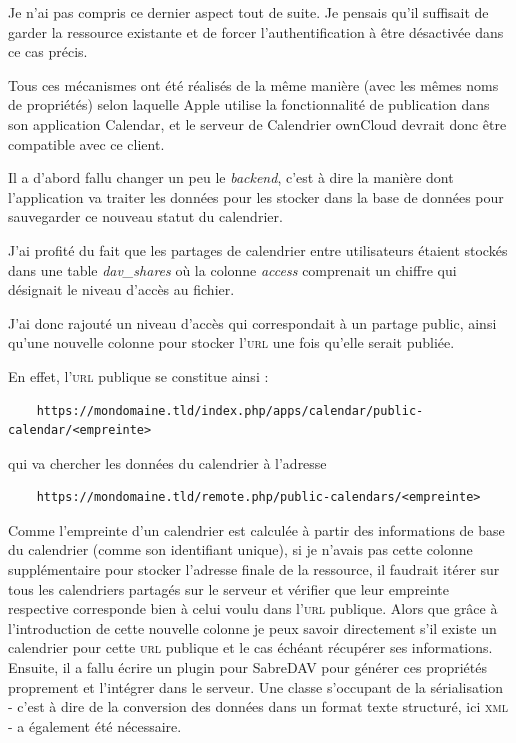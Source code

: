 \documentclass[10pt,a4paper, twoside]{report}
\begin{document}
	Je n'ai pas compris ce dernier aspect tout de suite. Je pensais qu'il suffisait de garder la ressource existante et de forcer l'authentification à être désactivée dans ce cas précis.
	
	Tous ces mécanismes ont été réalisés de la même manière (avec les mêmes noms de propriétés) selon laquelle Apple utilise la fonctionnalité de publication dans son application Calendar, et le serveur de Calendrier ownCloud devrait donc être compatible avec ce client.
	
	Il a d'abord fallu changer un peu le \textit{backend}, c'est à dire la manière dont l'application va traiter les données pour les stocker dans la base de données pour sauvegarder ce nouveau statut du calendrier.
	
	J'ai profité du fait que les partages de calendrier entre utilisateurs étaient stockés dans une table \textit{dav\_shares} où la colonne \textit{access} comprenait un chiffre qui désignait le niveau d'accès au fichier.
	
	J'ai donc rajouté un niveau d'accès qui correspondait à un partage public, ainsi qu'une nouvelle colonne pour stocker l'\textsc{url} une fois qu'elle serait publiée. 
	
	En effet, l'\textsc{url} publique se constitue ainsi : 
	\begin{verbatim}
	https://mondomaine.tld/index.php/apps/calendar/public-calendar/<empreinte>
	\end{verbatim}
	qui va chercher les données du calendrier à l'adresse
	\begin{verbatim}
	https://mondomaine.tld/remote.php/public-calendars/<empreinte>
	\end{verbatim}
	
	Comme l'empreinte d'un calendrier est calculée à partir des informations de base du calendrier (comme son identifiant unique), si je n'avais pas cette colonne supplémentaire pour stocker l'adresse finale de la ressource, il faudrait itérer sur tous les calendriers partagés sur le serveur et vérifier que leur empreinte respective corresponde bien à celui voulu dans l'\textsc{url} publique. Alors que grâce à l'introduction de cette nouvelle colonne je peux savoir directement s'il existe un calendrier pour cette \textsc{url} publique et le cas échéant récupérer ses informations.
	\\
	
	Ensuite, il a fallu écrire un plugin pour SabreDAV pour générer ces propriétés proprement et l'intégrer dans le serveur. Une classe s'occupant de la sérialisation - c'est à dire de la conversion des données dans un format texte structuré, ici \textsc{xml} - a également été nécessaire.
	\\
	
\end{document}
